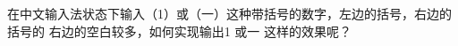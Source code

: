 \documentclass{ctexart}
\begin{document}
在中文输入法状态下输入（1）或（一）这种带括号的数字，左边的括号，右边的括号的 %
右边的空白较多，如何实现输出1 %
或一 这样的效果呢？
\end{document}
